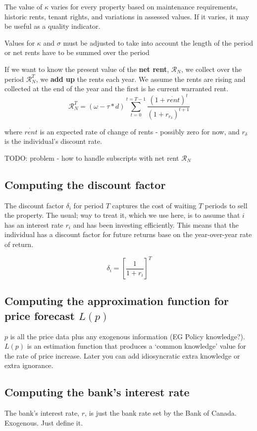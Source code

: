 The value of $\kappa$  varies for every property based on maintenance requirements, historic rents, tenant rights, and variations in assessed values. If it varies, it may be useful as a quality indicator.

Values for $\kappa$ and $\sigma$ must be adjusted to take into account the length of the period or net rents have to be summed over the period

If we want to know the  present value  of the \textbf{net rent}, $\mathcal{R}_N$, we collect over the period  $\mathcal{R}_N^T$, we \textbf{add up} the rents each year. We assume the rents are rising and collected at the end of the year and the first is he current warranted rent.
\[\mathcal{R}_N^T= (\omega-\tau*d)\sum_{t=0}^{t=T-1} \frac{(1+\dot{rent})^{t}} {(1+r_{r_\delta})^{t+1}} \]

\noindent where $\dot{rent}$ is an expected rate of change of rents - possibly zero for now, and $r_\delta$ is the individual's discount rate.

TODO: problem - how to handle subscripts with net rent $\mathcal{R}_N$


\subsection{Computing the discount factor}

The discount factor $\delta_i$ for period $T$ captures the cost of waiting $T$ periods to sell the property. The usual; way to treat it, which we use here, is to assume that $i$ has an interest rate $r_i$ and has been investing efficiently. This means that  the individual has a discount factor for future returns base on the year-over-year rate of return. 

\[\delta_i=\left[\frac{1}{1+r_i}\right]^T\]


\subsection{Computing the approximation function for price forecast $L(p)$}
$p$ is all the price data plus any exogenous information (EG Policy knowledge?). $L(p)$ is an estimation function that produces a `common knowledge' value for the rate of price increase. Later you can add idiosyncratic extra knowledge or extra ignorance.


\subsection{Computing the bank's interest rate}
The bank's interest rate, $r$, is just the bank rate set by the Bank of Canada. Exogenous. Just define it.


